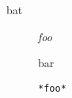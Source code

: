 
\def\mytitle{Nested Definition Lists}


\begin{description}
\item[bat]

\emph{foo}

bar

\begin{verbatim}
*foo*
\end{verbatim}
\end{description}



